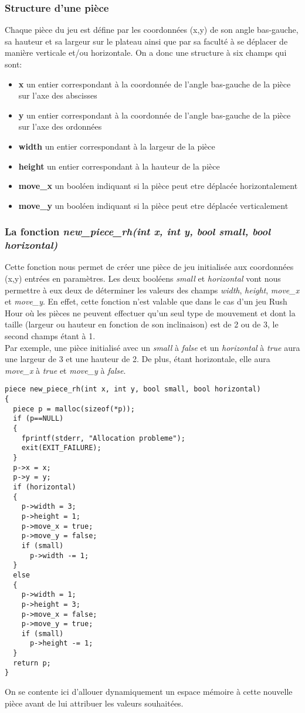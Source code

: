 \documentclass{report}
\begin{document}
\subsubsection*{Structure d'une pièce}
Chaque pièce du jeu est défine par les coordonnées (x,y) de son angle bas-gauche, sa hauteur et sa largeur sur le plateau ainsi que par sa faculté à se déplacer de manière verticale et/ou horizontale.
On a donc une structure à six champs qui sont:
\begin{itemize}
\item \textbf{x} un entier correspondant à la coordonnée de l'angle bas-gauche de la pièce sur l'axe des abscisses
\item \textbf{y} un entier correspondant à la coordonnée de l'angle bas-gauche de la pièce sur l'axe des ordonnées
\item \textbf{width} un entier correspondant à la largeur de la pièce
\item \textbf{height} un entier correspondant à la hauteur de la pièce
\item \textbf{move\_x} un booléen indiquant si la pièce peut etre déplacée horizontalement
\item \textbf{move\_y} un booléen indiquant si la pièce peut etre déplacée verticalement
\end{itemize} 
\subsubsection*{La fonction \textit{new\_piece\_rh(int x, int y, bool small, bool horizontal)}}
Cette fonction nous permet de créer une pièce de jeu initialisée aux coordonnées (x,y) entrées en paramètres. Les deux booléens \textit{small} et \textit{horizontal} vont nous permettre à eux deux de déterminer les valeurs des champs \textit{width}, \textit{height}, \textit{move\_x} et \textit{move\_y}. En effet, cette fonction n'est valable que dans le cas d'un jeu Rush Hour où les pièces ne peuvent effectuer qu'un seul type de mouvement et dont la taille (largeur ou hauteur en fonction de son inclinaison) est de 2 ou de 3, le second champs étant à 1.\\
Par exemple, une pièce initialisé avec un \textit{small} à \textit{false} et un \textit{horizontal} à \textit{true} aura une largeur de 3 et une hauteur de 2. De plus, étant horizontale, elle aura \textit{move\_x} à \textit{true} et \textit{move\_y} à \textit{false}.
\begin{lstlisting}
piece new_piece_rh(int x, int y, bool small, bool horizontal)
{
  piece p = malloc(sizeof(*p));
  if (p==NULL)
  {
    fprintf(stderr, "Allocation probleme");
    exit(EXIT_FAILURE);
  }
  p->x = x;
  p->y = y;
  if (horizontal)
  {
    p->width = 3;
    p->height = 1;
    p->move_x = true;
    p->move_y = false;
    if (small)
      p->width -= 1;
  }
  else
  {
    p->width = 1;
    p->height = 3;
    p->move_x = false;
    p->move_y = true;
    if (small)
      p->height -= 1;
  }
  return p;
}
\end{lstlisting}
On se contente ici d'allouer dynamiquement un espace mémoire à cette nouvelle pièce avant de lui attribuer les valeurs souhaitées.
\end{document}
